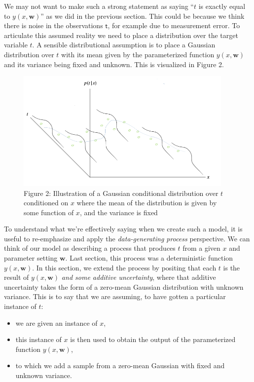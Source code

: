 \documentclass[
  0.875em,
  letterpaper,
  DIV=11,
  numbers=noendperiod]{scrartcl}
\providecommand{\tightlist}{%
  \setlength{\itemsep}{0pt}\setlength{\parskip}{0pt}}\usepackage{longtable,booktabs,array}
\begin{document}
We may not want to make such a strong statement as saying ``\(t\) is
exactly equal to \(y(x, \mathbf{w})\)'' as we did in the previous
section. This could be because we think there is noise in the
observations \(\pmb{\mathsf{t}}\), for example due to measurement error.
To articulate this assumed reality we need to place a distribution over
the target variable \(t\). A sensible distributional assumption is to
place a Gaussian distribution over \(t\) with its mean given by the
parameterized function \(y(x, \mathbf{w})\) and its variance being fixed
and unknown. This is visualized in Figure 2.

\begin{figure}

{\centering \includegraphics[width=4.16667in,height=\textheight]{./img/gaussian_noise_model.png}

}

\caption{Figure 2: Illustration of a Gaussian conditional distribution
over \(t\) conditioned on \(x\) where the mean of the distribution is
given by some function of \(x\), and the variance is fixed}

\end{figure}

To understand what we're effectively saying when we create such a model,
it is useful to re-emphasize and apply the \emph{data-generating
process} perspective. We can think of our model as describing a process
that produces \(t\) from a given \(x\) and parameter setting
\(\mathbf{w}\). Last section, this process was a deterministic function
\(y(x, \mathbf{w})\). In this section, we extend the process by positing
that each \(t\) is the result of \(y(x, \mathbf{w})\) \emph{and some
additive uncertainty}, where that additive uncertainty takes the form of
a zero-mean Gaussian distribution with unknown variance. This is to say
that we are assuming, to have gotten a particular instance of \(t\):

\begin{itemize}
\tightlist
\item
  we are given an instance of \(x\),
\item
  this instance of \(x\) is then used to obtain the output of the
  parameterized function \(y(x, \mathbf{w})\),
\item
  to which we add a sample from a zero-mean Gaussian with fixed and
  unknown variance.
\end{itemize}
\end{document}
